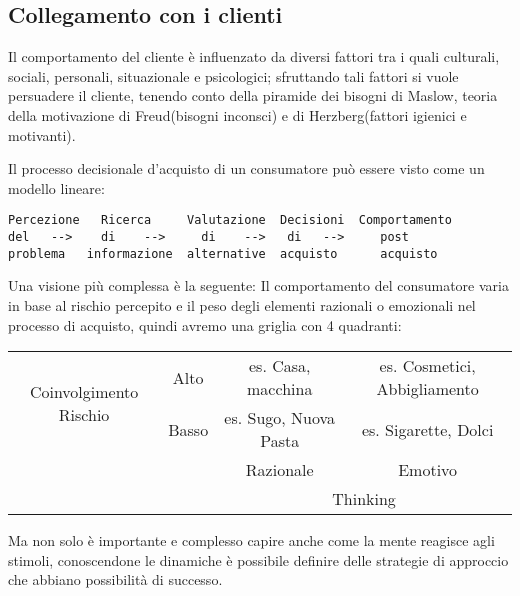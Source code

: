\documentclass[11pt]{article}
\begin{document}
\subsection{Collegamento con i clienti}
Il comportamento del cliente è influenzato da diversi fattori tra i quali culturali, sociali, personali, situazionale e psicologici; sfruttando tali fattori si vuole persuadere il cliente, tenendo conto della piramide dei bisogni di Maslow, teoria della motivazione di Freud(bisogni inconsci) e di Herzberg(fattori igienici e motivanti).

Il processo decisionale d'acquisto di un consumatore può essere visto come un modello lineare:
\begin{verbatim}
Percezione   Ricerca     Valutazione  Decisioni  Comportamento
del   -->    di    -->     di    -->   di   -->     post
problema   informazione  alternative  acquisto      acquisto
\end{verbatim}

Una visione più complessa è la seguente: Il comportamento del consumatore varia in base al rischio percepito e il peso degli elementi razionali o emozionali nel processo di acquisto, quindi avremo una griglia con 4 quadranti:
\begin{table}
	\centering
	\begin{tabular}{|c|c|c|c|}
		\hline
		\multirow{2}{*}{Coinvolgimento Rischio}& Alto & es. Casa, macchina & es. Cosmetici, Abbigliamento\\ \cline{2-4}
											   & Basso & es. Sugo, Nuova Pasta & es. Sigarette, Dolci\\ \hline
											   & & Razionale & Emotivo\\ \cline{3-4}
											   & & \multicolumn{2}{c|}{Thinking}\\ \hline                                
	\end{tabular}
\end{table}
Ma non solo è importante e complesso capire anche come la mente reagisce agli stimoli, conoscendone le dinamiche è possibile definire delle strategie di approccio che abbiano possibilità di successo.
\end{document}
